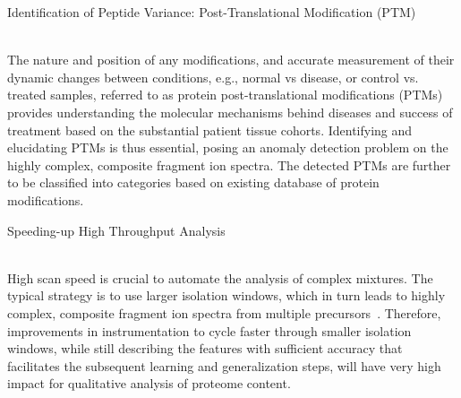 \documentclass{nature}
\begin{document}
\begin{enumerate}
    {\bf \item Identification of Peptide Variance: Post-Translational Modification (PTM)}\\
    The nature and position of any modifications, and accurate measurement of their dynamic changes between conditions, e.g., normal vs disease, or control vs. treated samples, referred to as protein post-translational modifications (PTMs) provides understanding the molecular mechanisms behind diseases and success of treatment based on the substantial patient tissue cohorts. Identifying and elucidating PTMs is thus essential, posing an anomaly detection problem on the highly complex, composite fragment ion spectra. The detected PTMs are further to be classified into categories based on existing database of protein modifications.
    

    {\bf \item Speeding-up High Throughput Analysis}\\   
    High scan speed is crucial to automate the analysis of complex mixtures. The typical strategy is to use larger isolation windows, which in turn leads to highly complex, composite fragment ion spectra from multiple precursors~\cite{Gillet2016MassSA}. Therefore, improvements in instrumentation to cycle faster through smaller isolation windows, while still describing the features with sufficient accuracy that facilitates the subsequent learning and generalization steps, will have very high impact for qualitative analysis of proteome content.

     
\end{enumerate}
\end{document}

